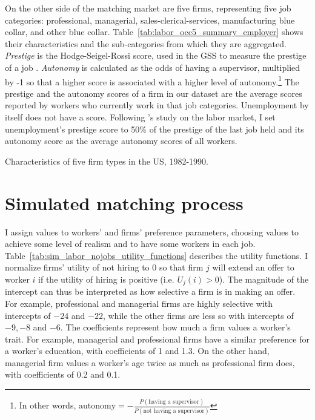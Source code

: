 On the other side of the matching market are five firms, representing five job
categories: professional, managerial, sales-clerical-services, manufacturing
blue collar, and other blue collar. Table~\ref{tab:labor_occ5_summary_employer}
shows their characteristics and the sub-categories from which they are
aggregated. \textit{Prestige} is the Hodge-Seigel-Rossi score, used in the GSS
to measure the prestige of a job \citep{Hodge1964, NORC2014}. \textit{Autonomy}
is calculated as the odds of having a supervisor, multiplied by -1 so that a
higher score is associated with a higher level of autonomy.\footnote{In other
  words, $\text{autonomy} = -\frac{P(\text{having a supervisor})}{P(\text{not
      having a supervisor})}$} The prestige and the autonomy scores of a firm in
our dataset are the average scores reported by workers who currently work in
that job categories. Unemployment by itself does not have a score. Following
\citet{Logan1996}'s study on the labor market, I set unemployment's prestige
score to 50\% of the prestige of the last job held and its autonomy score as the
average autonomy scores of all workers.

\begin{table}[tbp]
  \centering
  \caption[Characteristics of five firm types in the US,
  1982-1990.]{Characteristics of five firm types in the US, 1982-1990.}
  \label{tab:labor_occ5_summary_employer}
  
\end{table}

\section{Simulated matching process}

I assign values to workers' and firms' preference parameters, choosing values to
achieve some level of realism and to have some workers in each job.
Table~\ref{tab:sim_labor_nojobs_utility_functions} describes the utility
functions. I normalize firms' utility of not hiring to 0 so that firm $j$ will
extend an offer to worker $i$ if the utility of hiring is positive (i.e.
$U_{j}(i) > 0$). The magnitude of the intercept can thus be interpreted as how
selective a firm is in making an offer. For example, professional and managerial
firms are highly selective with intercepts of $-24$ and $-22$, while the other
firms are less so with intercepts of $-9, -8$ and $-6$. The coefficients
represent how much a firm values a worker's trait. For example, managerial and
professional firms have a similar preference for a worker's education, with
coefficients of 1 and 1.3. On the other hand, managerial firm values a worker's
age twice as much as professional firm does, with coefficients of 0.2 and 0.1.

